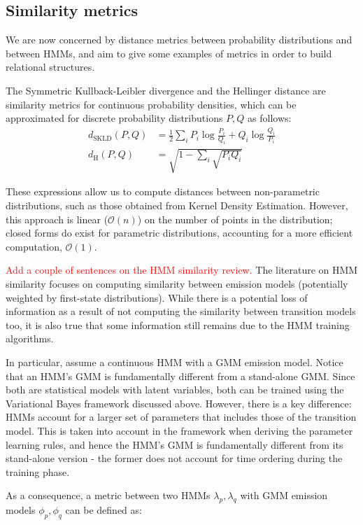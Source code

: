 \documentclass[pdftex,11pt,a4paper]{article}
\theoremstyle{definition}
\theoremstyle{remark}
\begin{document}
\subsection{Similarity metrics}
We are now concerned by distance metrics between probability distributions and between HMMs, and aim to give some examples of metrics in order to build relational structures.
\par The Symmetric Kullback-Leibler divergence and the Hellinger distance are similarity metrics for continuous probability densities, which can be approximated for discrete probability distributions $P, Q$ as follows:
\begin{align*}
d_{\text{SKLD}}(P, Q) &= \frac{1}{2}\sum_iP_i\log{\frac{P_i}{Q_i}} + Q_i\log{\frac{Q_i}{P_i}}\\
d_{\text{H}}(P, Q) &= \sqrt{1 - \sum_i \sqrt{P_iQ_i}}
\end{align*}
\par These expressions allow us to compute distances between non-parametric distributions, such as those obtained from Kernel Density Estimation. However, this approach is linear ($\mathcal{O}(n)$) on the number of points in the distribution; closed forms do exist for parametric distributions, accounting for a more efficient computation, $\mathcal{O}(1)$. 
\par \textcolor{red}{Add a couple of sentences on the HMM similarity review.} The literature on HMM similarity focuses on computing similarity between emission models (potentially weighted by first-state distributions). While there is a potential loss of information as a result of not computing the similarity between transition models too, it is also true that some information still remains due to the HMM training algorithms. 
\par In particular, assume a continuous HMM with a GMM emission model. Notice that an HMM's GMM is fundamentally different from a stand-alone GMM. Since both are statistical models with latent variables, both can be trained using the Variational Bayes framework discussed above. However, there is a key difference: HMMs account for a larger set of parameters that includes those of the transition model. This is taken into account in the framework when deriving the parameter learning rules, and hence the HMM's GMM is fundamentally different from its stand-alone version - the former does not account for time ordering during the training phase.
\par As a consequence, a metric between two HMMs $\lambda_p, \lambda_q$ with GMM emission models $\phi_p, \phi_q$ can be defined as:
\end{document}
